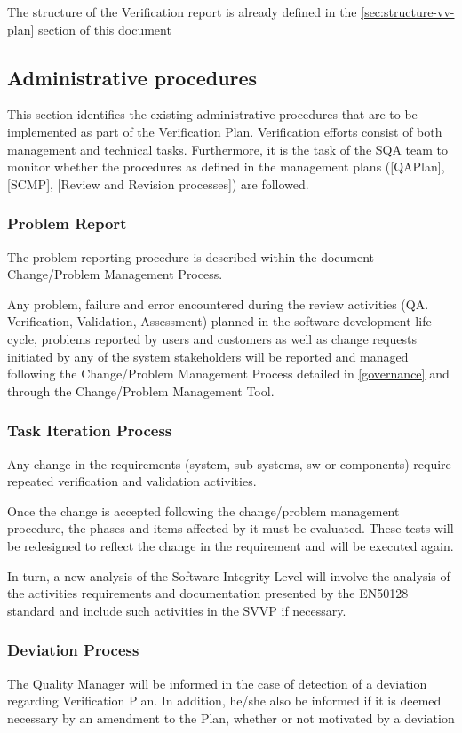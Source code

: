 \documentclass{template/openetcs_report}
\begin{document}
The structure of the Verification report is already defined in the
\ref{sec:structure-vv-plan} section of this document 

\subsection{Administrative procedures}
This section identifies the existing administrative procedures that
are to be implemented as part of the Verification Plan. 
Verification efforts consist of both management and technical tasks.
Furthermore, it is the task of the SQA team to monitor whether the
procedures as defined in the management plans ([QAPlan], [SCMP],
[Review and Revision processes]) are followed. 

\subsubsection{Problem Report}
The problem reporting procedure is described within the document Change/Problem Management Process.

Any problem, failure and error encountered during the review activities (QA. Verification, Validation, Assessment) planned in the software development life-cycle, problems reported by users and customers as well as change requests initiated by any of the system stakeholders will be reported and managed following the Change/Problem Management Process detailed in \href{https://github.com/openETCS/governance/tree/master/Change-Problem%20Process}{[governance]} and through the Change/Problem Management Tool.

\subsubsection{Task Iteration Process}
Any change in the requirements (system, sub-systems, sw or components)
require repeated verification and validation activities. 

Once the change is accepted following the change/problem management
procedure, the phases and items affected by it must be
evaluated. These tests will be redesigned to reflect the change in the
requirement and will be executed again. 

In turn, a new analysis of the Software Integrity Level will involve
the analysis of the activities requirements and documentation
presented by the EN50128 standard and include such activities in the
SVVP if necessary. 

\subsubsection{Deviation Process}
The Quality Manager will be informed in the case of detection of a
deviation regarding Verification Plan. In addition, he/she also be
informed if it is deemed necessary by an amendment to the Plan,
whether or not motivated by a deviation 
\end{document}
